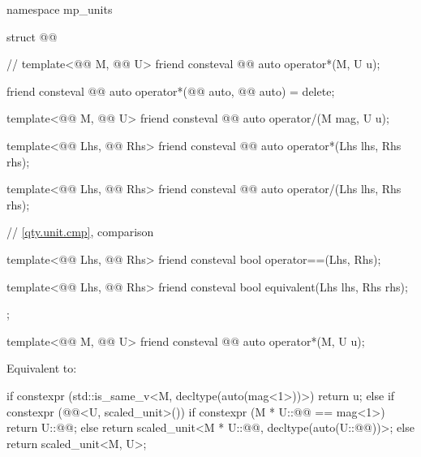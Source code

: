 \begin{codeblock}
namespace mp_units {

struct @@ {  // \expos
  template<@@ M, @@ U>
  friend consteval @@ auto operator*(M, U u);

  friend consteval @@ auto operator*(@@ auto, @@ auto) = delete;

  template<@@ M, @@ U>
  friend consteval @@ auto operator/(M mag, U u);

  template<@@ Lhs, @@ Rhs>
  friend consteval @@ auto operator*(Lhs lhs, Rhs rhs);

  template<@@ Lhs, @@ Rhs>
  friend consteval @@ auto operator/(Lhs lhs, Rhs rhs);

  // \ref{qty.unit.cmp}, comparison

  template<@@ Lhs, @@ Rhs>
  friend consteval bool operator==(Lhs, Rhs);

  template<@@ Lhs, @@ Rhs>
  friend consteval bool equivalent(Lhs lhs, Rhs rhs);
};

}
\end{codeblock}

\begin{itemdecl}
template<@@ M, @@ U>
friend consteval @@ auto operator*(M, U u);
\end{itemdecl}

\begin{itemdescr}
\pnum
\effects
Equivalent to:
\begin{codeblock}
if constexpr (std::is_same_v<M, decltype(auto(mag<1>))>)
  return u;
else if constexpr (@@<U, scaled_unit>()) {
  if constexpr (M{} * U::@@ == mag<1>)
    return U::@@;
  else
    return scaled_unit<M{} * U::@@, decltype(auto(U::@@))>{};
} else
  return scaled_unit<M{}, U>{};
\end{codeblock}
\end{itemdescr}

